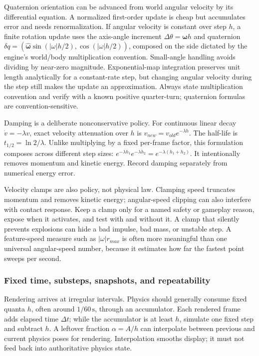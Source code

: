 Quaternion orientation can be advanced from world angular velocity by its differential equation. A normalized first-order update is cheap but accumulates error and needs renormalization. If angular velocity is constant over step \(h\), a finite rotation update uses the axis-angle increment \(\Delta\theta=\boldsymbol\omega h\) and quaternion \(\delta q=(\hat{\boldsymbol\omega}\sin(|\omega|h/2),\cos(|\omega|h/2))\), composed on the side dictated by the engine's world/body multiplication convention. Small-angle handling avoids dividing by near-zero magnitude. Exponential-map integration preserves unit length analytically for a constant-rate step, but changing angular velocity during the step still makes the update an approximation. Always state multiplication convention and verify with a known positive quarter-turn; quaternion formulas are convention-sensitive.

Damping is a deliberate nonconservative policy. For continuous linear decay \(\dot v=-\lambda v\), exact velocity attenuation over \(h\) is \(v_{new}=v_{old}e^{-\lambda h}\). The half-life is \(t_{1/2}=\ln2/\lambda\). Unlike multiplying by a fixed per-frame factor, this formulation composes across different step sizes: \(e^{-\lambda h_1}e^{-\lambda h_2}=e^{-\lambda(h_1+h_2)}\). It intentionally removes momentum and kinetic energy. Record damping separately from numerical energy error.

Velocity clamps are also policy, not physical law. Clamping speed truncates momentum and removes kinetic energy; angular-speed clipping can also interfere with contact response. Keep a clamp only for a named safety or gameplay reason, expose when it activates, and test with and without it. A clamp that silently prevents explosions can hide a bad impulse, bad mass, or unstable step. A feature-speed measure such as \(|\omega|r_{max}\) is often more meaningful than one universal angular-speed number, because it estimates how far the fastest point sweeps per second.

\subsubsection{Fixed time, substeps, snapshots, and repeatability}\label{fixed-time-substeps-snapshots-and-repeatability}

Rendering arrives at irregular intervals. Physics should generally consume fixed quanta \(h\), often around \(1/60\,\mathrm s\), through an accumulator. Each rendered frame adds elapsed time \(\Delta t\); while the accumulator is at least \(h\), simulate one fixed step and subtract \(h\). A leftover fraction \(\alpha=A/h\) can interpolate between previous and current physics poses for rendering. Interpolation smooths display; it must not feed back into authoritative physics state.

